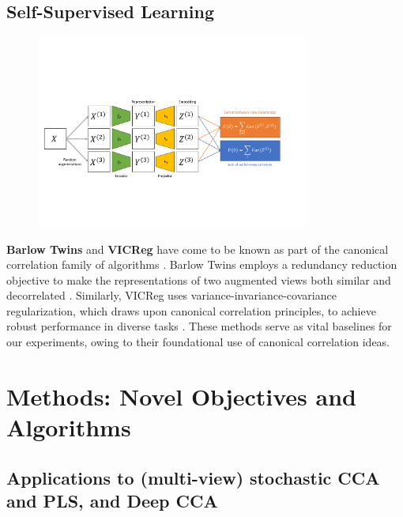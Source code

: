 \subsection{Self-Supervised Learning}

\begin{figure}
    \centering
    \includegraphics[width=0.8\textwidth]{figures/ssl_schematic}
\end{figure}

\textbf{Barlow Twins} and \textbf{VICReg} have come to be known as part of the canonical correlation family of algorithms \citep{balestriero2023cookbook}. Barlow Twins employs a redundancy reduction objective to make the representations of two augmented views both similar and decorrelated \citep{zbontar2021barlow}. Similarly, VICReg uses variance-invariance-covariance regularization, which draws upon canonical correlation principles, to achieve robust performance in diverse tasks \citep{bardes2021vicreg}. These methods serve as vital baselines for our experiments, owing to their foundational use of canonical correlation ideas.

\section{Methods: Novel Objectives and Algorithms}\label{sec:contributions}

\subsection{Applications to (multi-view) stochastic CCA and PLS, and Deep CCA}

